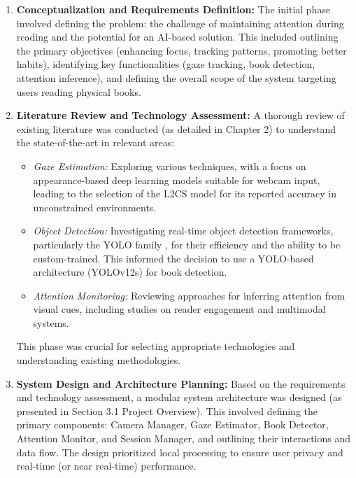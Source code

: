 \begin{enumerate}
    \item \textbf{Conceptualization and Requirements Definition:}
    The initial phase involved defining the problem: the challenge of maintaining attention during reading and the potential for an AI-based solution. This included outlining the primary objectives (enhancing focus, tracking patterns, promoting better habits), identifying key functionalities (gaze tracking, book detection, attention inference), and defining the overall scope of the system targeting users reading physical books.

    \item \textbf{Literature Review and Technology Assessment:}
    A thorough review of existing literature was conducted (as detailed in Chapter 2) to understand the state-of-the-art in relevant areas:
    \begin{itemize}
        \item \textit{Gaze Estimation:} Exploring various techniques, with a focus on appearance-based deep learning models suitable for webcam input, leading to the selection of the L2CS model \cite{L2CSNet2022} for its reported accuracy in unconstrained environments.
        \item \textit{Object Detection:} Investigating real-time object detection frameworks, particularly the YOLO family \cite{Redmon_YOLO_2016, Jocher_YOLOv5_2020, ultralytics_yolov8_2023}, for their efficiency and the ability to be custom-trained. This informed the decision to use a YOLO-based architecture (YOLOv12s) for book detection.
        \item \textit{Attention Monitoring:} Reviewing approaches for inferring attention from visual cues, including studies on reader engagement and multimodal systems.
    \end{itemize}
    This phase was crucial for selecting appropriate technologies and understanding existing methodologies.

    \item \textbf{System Design and Architecture Planning:}
    Based on the requirements and technology assessment, a modular system architecture was designed (as presented in Section 3.1 Project Overview). This involved defining the primary components: Camera Manager, Gaze Estimator, Book Detector, Attention Monitor, and Session Manager, and outlining their interactions and data flow. The design prioritized local processing to ensure user privacy and real-time (or near real-time) performance.


\end{enumerate}
